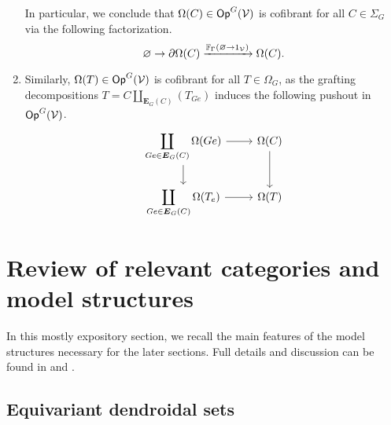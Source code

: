\documentclass[a4paper,10pt
,draft
]{article}%
\renewcommand{\1}{\eta}%
\begin{document}
\begin{example}
\begin{enumerate}[label = (\roman*)]
            In particular, we conclude that $\Omega(C) \in \mathsf{Op}^G(\mathcal V)$ is cofibrant for all $C \in \Sigma_G$ via the following factorization.
            \[
                  \varnothing \to \partial\Omega(C) \xrightarrow{\mathbb F_{\Gamma}(\varnothing \to 1_{\mathcal V})} \Omega(C).
            \]
      \item Similarly, $\Omega(T) \in \mathsf{Op}^G(\mathcal V)$ is cofibrant for all $T \in \Omega_G$, as
            the grafting decompositions $T = C \coprod_{\boldsymbol{E}_G(C)} (T_{Ge})$ induces the following pushout in $\mathsf{Op}^G(\mathcal V)$.
            \[
                  \begin{tikzcd}
                        \displaystyle{
                          \coprod_{Ge \in \boldsymbol{E}_G(C)} \Omega(Ge)}
                        \arrow[r] \arrow[d]
                        &
                        \Omega(C) \arrow[d]
                        \\
                        \displaystyle{
                          \coprod_{Ge \in \boldsymbol{E}_G(C)} \Omega(T_e)}
                        \arrow[r]
                        &
                        \Omega(T)
                  \end{tikzcd}
            \]            
      \end{enumerate}
\end{example}











\iffalse%




\newpage

\section{Review of relevant categories and model structures}

In this mostly expository section, we recall the main features of the model structures necessary for the later sections.
Full details and discussion can be found in \cite{BP_edss} and \cite{Per18}.


\subsection{Equivariant dendroidal sets}
\label{EDS_SEC}
\end{document}
